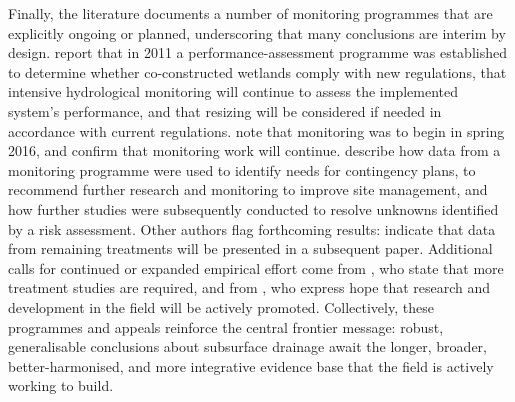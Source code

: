 Finally, the literature documents a number of monitoring programmes that are explicitly ongoing or planned, underscoring that many conclusions are interim by design. \textcite{Tournebize2012} report that in 2011 a performance-assessment programme was established to determine whether co-constructed wetlands comply with new regulations, that intensive hydrological monitoring will continue to assess the implemented system's performance, and that resizing will be considered if needed in accordance with current regulations. \textcite{Kjaersgaard2016} note that monitoring was to begin in spring 2016, and \textcite{Ali2001} confirm that monitoring work will continue. \textcite{Ohlendorf2002} describe how data from a monitoring programme were used to identify needs for contingency plans, to recommend further research and monitoring to improve site management, and how further studies were subsequently conducted to resolve unknowns identified by a risk assessment. Other authors flag forthcoming results: \textcite{Drury2014} indicate that data from remaining treatments will be presented in a subsequent paper. Additional calls for continued or expanded empirical effort come from \textcite{Rekha2011}, who state that more treatment studies are required, and from \textcite{Ogino2007}, who express hope that research and development in the field will be actively promoted. Collectively, these programmes and appeals reinforce the central frontier message: robust, generalisable conclusions about subsurface drainage await the longer, broader, better-harmonised, and more integrative evidence base that the field is actively working to build.